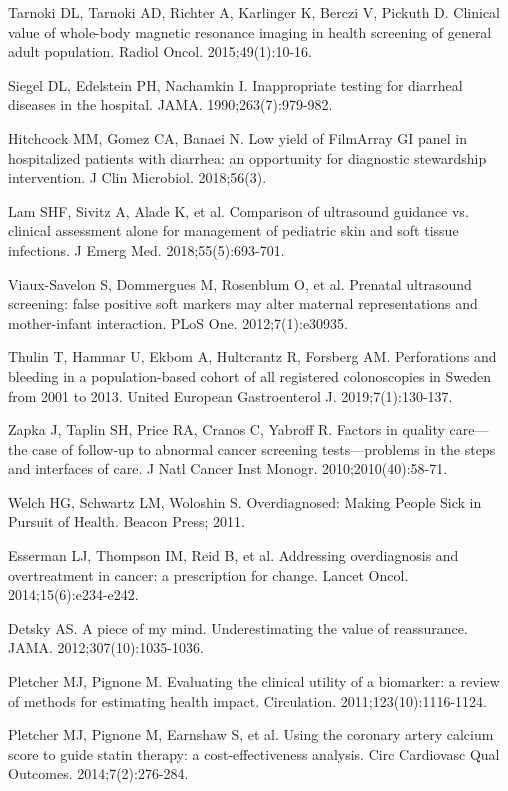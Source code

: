 \begin{references}
\item Tarnoki DL, Tarnoki AD, Richter A, Karlinger K, Berczi V, Pickuth D. Clinical value of whole-body magnetic resonance imaging in health screening of general adult population. Radiol Oncol. 2015;49(1):10-16.
\item Siegel DL, Edelstein PH, Nachamkin I. Inappropriate testing for diarrheal diseases in the hospital. JAMA. 1990;263(7):979-982.
\item Hitchcock MM, Gomez CA, Banaei N. Low yield of FilmArray GI panel in hospitalized patients with diarrhea: an opportunity for diagnostic stewardship intervention. J Clin Microbiol. 2018;56(3).
\item Lam SHF, Sivitz A, Alade K, et al. Comparison of ultrasound guidance vs. clinical assessment alone for management of pediatric skin and soft tissue infections. J Emerg Med. 2018;55(5):693-701.
\item Viaux-Savelon S, Dommergues M, Rosenblum O, et al. Prenatal ultrasound screening: false positive soft markers may alter maternal representations and mother-infant interaction. PLoS One. 2012;7(1):e30935.
\item Thulin T, Hammar U, Ekbom A, Hultcrantz R, Forsberg AM. Perforations and bleeding in a population-based cohort of all registered colonoscopies in Sweden from 2001 to 2013. United European Gastroenterol J. 2019;7(1):130-137.
\item Zapka J, Taplin SH, Price RA, Cranos C, Yabroff R. Factors in quality care— the case of follow-up to abnormal cancer screening tests—problems in the steps and interfaces of care. J Natl Cancer Inst Monogr. 2010;2010(40):58-71.
\item Welch HG, Schwartz LM, Woloshin S. Overdiagnosed: Making People Sick in Pursuit of Health. Beacon Press; 2011.
\item Esserman LJ, Thompson IM, Reid B, et al. Addressing overdiagnosis and overtreatment in cancer: a prescription for change. Lancet Oncol. 2014;15(6):e234-e242.
\item Detsky AS. A piece of my mind. Underestimating the value of reassurance. JAMA. 2012;307(10):1035-1036.
\item Pletcher MJ, Pignone M. Evaluating the clinical utility of a biomarker: a review of methods for estimating health impact. Circulation. 2011;123(10):1116-1124.
\item Pletcher MJ, Pignone M, Earnshaw S, et al. Using the coronary artery calcium score to guide statin therapy: a cost-effectiveness analysis. Circ Cardiovasc Qual Outcomes. 2014;7(2):276-284.

\end{references}
